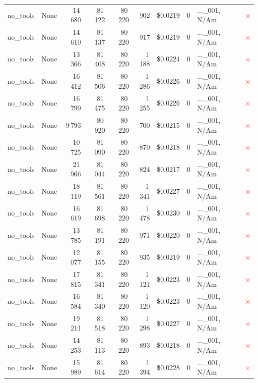 \documentclass[a4paper,11pt]{article}
\begin{document}
\begin{table}[H]
{\begin{tabular}{l r r r r r r r l c}
no\_tools & None & 14\,680 & 81\,122 & 80\,220 & 902 & \$0.0219 & 0 & ...\_001, N/Am & \textcolor{red}{\(\times\)} \\
no\_tools & None & 14\,610 & 81\,137 & 80\,220 & 917 & \$0.0219 & 0 & ...\_001, N/Am & \textcolor{red}{\(\times\)} \\
no\_tools & None & 13\,366 & 81\,408 & 80\,220 & 1\,188 & \$0.0224 & 0 & ...\_001, N/Am & \textcolor{red}{\(\times\)} \\
no\_tools & None & 16\,412 & 81\,506 & 80\,220 & 1\,286 & \$0.0226 & 0 & ...\_001, N/Am & \textcolor{red}{\(\times\)} \\
no\_tools & None & 16\,799 & 81\,475 & 80\,220 & 1\,255 & \$0.0226 & 0 & ...\_001, N/Am & \textcolor{red}{\(\times\)} \\
no\_tools & None & 9\,793 & 80\,920 & 80\,220 & 700 & \$0.0215 & 0 & ...\_001, N/Am & \textcolor{red}{\(\times\)} \\
no\_tools & None & 10\,725 & 81\,090 & 80\,220 & 870 & \$0.0218 & 0 & ...\_001, N/Am & \textcolor{red}{\(\times\)} \\
no\_tools & None & 21\,966 & 81\,044 & 80\,220 & 824 & \$0.0217 & 0 & ...\_001, N/Am & \textcolor{red}{\(\times\)} \\
no\_tools & None & 18\,119 & 81\,561 & 80\,220 & 1\,341 & \$0.0227 & 0 & ...\_001, N/Am & \textcolor{red}{\(\times\)} \\
no\_tools & None & 16\,619 & 81\,698 & 80\,220 & 1\,478 & \$0.0230 & 0 & ...\_001, N/Am & \textcolor{red}{\(\times\)} \\
no\_tools & None & 13\,785 & 81\,191 & 80\,220 & 971 & \$0.0220 & 0 & ...\_001, N/Am & \textcolor{red}{\(\times\)} \\
no\_tools & None & 12\,077 & 81\,155 & 80\,220 & 935 & \$0.0219 & 0 & ...\_001, N/Am & \textcolor{red}{\(\times\)} \\
no\_tools & None & 17\,815 & 81\,341 & 80\,220 & 1\,121 & \$0.0223 & 0 & ...\_001, N/Am & \textcolor{red}{\(\times\)} \\
no\_tools & None & 16\,584 & 81\,340 & 80\,220 & 1\,120 & \$0.0223 & 0 & ...\_001, N/Am & \textcolor{red}{\(\times\)} \\
no\_tools & None & 19\,211 & 81\,518 & 80\,220 & 1\,298 & \$0.0227 & 0 & ...\_001, N/Am & \textcolor{red}{\(\times\)} \\
no\_tools & None & 14\,253 & 81\,113 & 80\,220 & 893 & \$0.0218 & 0 & ...\_001, N/Am & \textcolor{red}{\(\times\)} \\
no\_tools & None & 15\,989 & 81\,614 & 80\,220 & 1\,394 & \$0.0228 & 0 & ...\_001, N/Am & \textcolor{red}{\(\times\)} \\

\end{tabular}}
\end{table}
\end{document}
